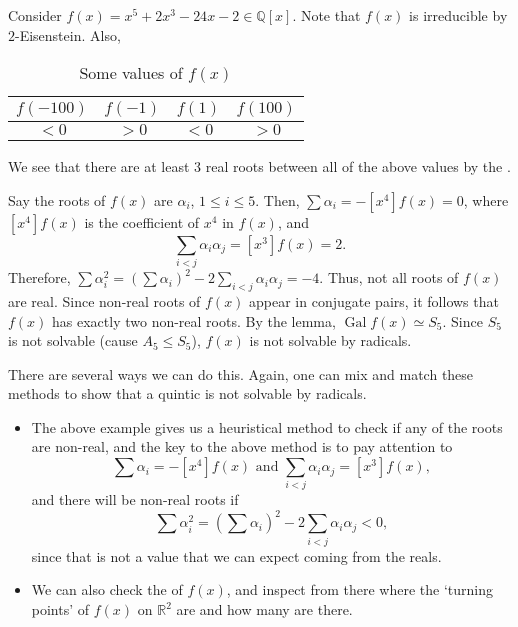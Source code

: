 \documentclass[notoc,notitlepage,nobib]{tufte-book}
\DeclareMathOperator{\Gal}{Gal}
\begin{document}
\begin{eg}
  Consider $f(x) = x^5 + 2x^3 - 24x - 2 \in \mathbb{Q}[x]$. Note that $f(x)$ is
  irreducible by $2$-Eisenstein. Also, 
  \begin{table}[ht]
    \centering
    \caption{Some values of $f(x)$}
    \label{table:some_values_of_f_x}
    \begin{tabular}{c c c c}
      $f(-100)$ & $f(-1)$ & $f(1)$ & $f(100)$ \\
      \hline
      $< 0$     & $> 0$   & $< 0$  & $> 0$
    \end{tabular}
  \end{table}

  We see that there are at least 3 real roots between all of the above values by
  the .

  Say the roots of $f(x)$ are $\alpha_i$, $1 \leq i \leq 5$. Then, $\sum
  \alpha_i = - [x^4] f(x) = 0$, where $[x^4] f(x)$ is the coefficient of $x^4$ 
  in $f(x)$, and
  \begin{equation*}
    \sum_{i < j} \alpha_i \alpha_j = [x^3] f(x) = 2. 
  \end{equation*}
  Therefore, $\sum \alpha_i^2 = \left( \sum \alpha_i \right)^2 - 2 \sum_{i < j} \alpha_i
  \alpha_j = -4$. Thus, not all roots of $f(x)$ are real. Since non-real roots
  of $f(x)$ appear in conjugate pairs, it follows that $f(x)$ has exactly two
  non-real roots. By the lemma, $\Gal f(x) \simeq S_5$. Since $S_5$ is not
  solvable (cause $A_5 \leq S_5$), $f(x)$ is not solvable by radicals.
\end{eg}

\begin{procedure}\label{procedure:showing_insolvability_of_a_quintic}
  There are several ways we can do this. Again, one can mix and match these
  methods to show that a quintic is not solvable by radicals.
  \begin{itemize}
    \item The above example gives us a heuristical method to check if any of the
      roots are non-real, and the key to the above method is to pay attention to
      \begin{equation*}
        \sum \alpha_i = - [x^4]f(x) \text{ and } \sum_{i < j} \alpha_i \alpha_j
        = [x^3]f(x),
      \end{equation*}
      and there will be non-real roots if
      \begin{equation*}
        \sum \alpha_i^2 = \left( \sum \alpha_i \right)^2 - 2 \sum_{i < j}
        \alpha_i \alpha_j < 0,
      \end{equation*}
      since that is not a value that we can expect coming from the reals.
    \item We can also check the  of $f(x)$, and inspect from
      there where the `turning points' of $f(x)$ on $\mathbb{R}^2$ are and how
      many are there.
  \end{itemize}
\end{procedure}
\end{document}
